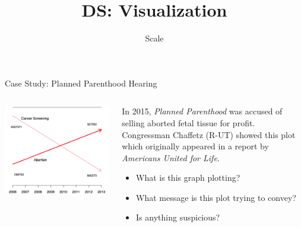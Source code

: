 \documentclass[aspectratio=169]{../latex_main/tntbeamer}  %
\title[Visualization]{DS: Visualization}
\subtitle{Scale}
\begin{document}
	
	\maketitle
	\begin{frame}{Case Study: Planned Parenthood Hearing}
	    \begin{columns}
	        \begin{column}{.5\textwidth}
	        
	                    \centering
	                    \includegraphics[scale=.65]{Bild51}
	        \end{column}
	        
	        \begin{column}{.5\textwidth}
	        
	                In 2015, \textit{Planned Parenthood} was accused of selling aborted fetal tissue for profit.\\
	                Congressman Chaffetz (R-UT) showed this plot which originally appeared in a report by \textit{Americans United for Life}.
	                \begin{itemize}
	                    \item What is this graph plotting?
	                    \item What message is this plot trying to convey?
	                    \item Is anything suspicious?	
	                \end{itemize}
	                
	        \end{column}
	    \end{columns}
	\end{frame}
	
\end{document}
